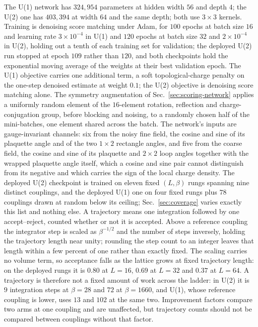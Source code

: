 \documentclass[prd, twocolumn, superscriptaddress, nofootinbib,floatfix]{revtex4-2}
\DeclareRobustCommand{\sect}[1]{Sec.~\ref{sec:#1}}
\begin{document}
The U(1) network has $324{,}954$ parameters at
hidden width $56$ and depth $4$; the U(2) one has $403{,}394$ at width $64$ and
the same depth; both use $3\times3$ kernels. Training is denoising score
matching under Adam, for $100$ epochs at batch size $16$ and learning rate
$3\times10^{-4}$ in U(1) and $120$ epochs at batch size $32$ and
$2\times10^{-4}$ in U(2), holding out a tenth of each training set for
validation; the deployed U(2) run stopped at epoch $109$ rather than $120$, and
both checkpoints hold the exponential moving average of the weights at their
best validation epoch. The U(1) objective carries one additional term, a soft topological-charge
penalty on the one-step denoised estimate at weight $0.1$; the U(2) objective is
denoising score matching alone. The symmetry augmentation of
\sect{scoring-network} applies a uniformly random element of the $16$-element
rotation, reflection and charge-conjugation group, before blocking and noising,
to a randomly chosen half of the mini-batches, one element shared across the
batch. The network's inputs are gauge-invariant channels: six from the noisy
fine field, the cosine and sine of its plaquette angle and of the two $1\times2$
rectangle angles, and five from the coarse field, the cosine and sine of its
plaquette and $2\times2$ loop angles together with the wrapped plaquette angle
itself, which a cosine and sine pair cannot distinguish from its negative and
which carries the sign of the local charge density. The
deployed U(2) checkpoint is trained on eleven fixed $(L,\beta)$ rungs spanning
nine distinct couplings, and the deployed U(1) one on four fixed rungs plus $78$
couplings drawn at random below its ceiling; \sect{coverage} varies exactly this list and
nothing else. A trajectory means one integration followed by one
accept--reject, counted whether or not it is accepted. Above a reference
coupling the integrator step is scaled as $\beta^{-1/2}$ and the number of steps
inversely, holding the trajectory length near unity; rounding the step count to
an integer leaves that length within a few percent of one rather than exactly
fixed. The scaling carries no volume term, so acceptance falls as the lattice
grows at fixed trajectory length: on the deployed rungs it is $0.80$ at
$L=16$, $0.69$ at $L=32$ and $0.37$ at $L=64$. A trajectory is therefore not a fixed
amount of work across the ladder: in U(2) it is $9$ integration
steps at $\beta=28$ and $72$ at $\beta=1660$, and U(1), whose reference coupling
is lower, uses $13$ and $102$ at the same two. Improvement factors compare two
arms at one coupling and are unaffected, but trajectory counts should not be
compared between couplings without that factor.
\end{document}
